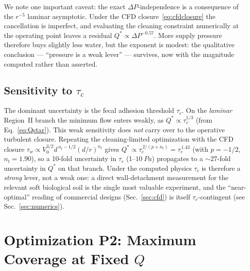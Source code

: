 \documentclass[aps,prfluids,reprint,amsmath,amssymb,floatfix]{revtex4-2}
\begin{document}
We note one important caveat: the exact $\Delta P$-independence is a
consequence of the $r^{-5}$ laminar asymptotic. Under the CFD
closure~\eqref{eq:cfdclosure} the cancellation is imperfect, and evaluating
the cleaning constraint numerically at the operating point leaves a residual
$Q^* \propto \Delta P^{-0.57}$. More supply pressure therefore buys slightly
less water, but the exponent is modest: the qualitative conclusion ---
``pressure is a weak lever'' --- survives, now with the magnitude computed
rather than asserted.

\subsection{Sensitivity to $\tau_c$}

The dominant uncertainty is the fecal adhesion threshold $\tau_c$. On the
\emph{laminar} Region~II branch the minimum flow enters weakly, as
$Q^* \propto \tau_c^{1/3}$ (from Eq.~\eqref{eq:Qstar}). This weak sensitivity
does \emph{not} carry over to the operative turbulent closure. Repeating the
cleaning-limited optimization with the CFD closure
$\tau_w \propto V_0^{3/2} d^{\,n_t-1/2}(d/r)^{n_t}$ gives
$Q^* \propto \tau_c^{\,2/(p+n_t)} = \tau_c^{\,1.43}$ (with $p=-1/2$,
$n_t=1.90$), so a 10-fold uncertainty in $\tau_c$ (1--$\SI{10}{Pa}$)
propagates to a $\sim27$-fold uncertainty in $Q^*$ on that branch. Under the
computed physics $\tau_c$ is therefore a \emph{strong} lever, not a weak one:
a direct wall-detachment measurement for the relevant soft biological soil is
the single most valuable experiment, and the ``near-optimal'' reading of
commercial designs (Sec.~\ref{sec:cfd}) is itself $\tau_c$-contingent (see
Sec.~\ref{sec:numerics}).

\section{Optimization P2: Maximum Coverage at Fixed $Q$}
\label{sec:P2}
\end{document}
